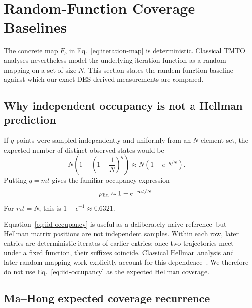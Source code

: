 \section{Random-Function Coverage Baselines}
\label{sec:theory}

The concrete map $F_b$ in Eq.~\eqref{eq:iteration-map} is deterministic.
Classical TMTO analyses nevertheless model the underlying iteration function as
a random mapping on a set of size $N$.  This section states the random-function
baseline against which our exact DES-derived measurements are compared.

\subsection{Why independent occupancy is not a Hellman prediction}

If $q$ points were sampled independently and uniformly from an $N$-element
set, the expected number of distinct observed states would be
\[
    N\left(1-\left(1-\frac1N\right)^q\right)
    \approx N(1-e^{-q/N}).
\]
Putting $q=mt$ gives the familiar occupancy expression
\begin{equation}
    \rho_{\rm iid}
      \approx
      1-e^{-mt/N}.
    \label{eq:iid-occupancy}
\end{equation}
For $mt=N$, this is $1-e^{-1}\approx0.6321$.

Equation~\eqref{eq:iid-occupancy} is useful as a deliberately naive reference,
but Hellman matrix positions are not independent samples.  Within each row,
later entries are deterministic iterates of earlier entries; once two
trajectories meet under a fixed function, their suffixes coincide.  Classical
Hellman analysis and later random-mapping work explicitly account for this
dependence~\cite{Hellman1980,FlajoletOdlyzko1990,MaHong2009}.  We therefore do
not use Eq.~\eqref{eq:iid-occupancy} as the expected Hellman coverage.

\subsection{Ma--Hong expected coverage recurrence}

